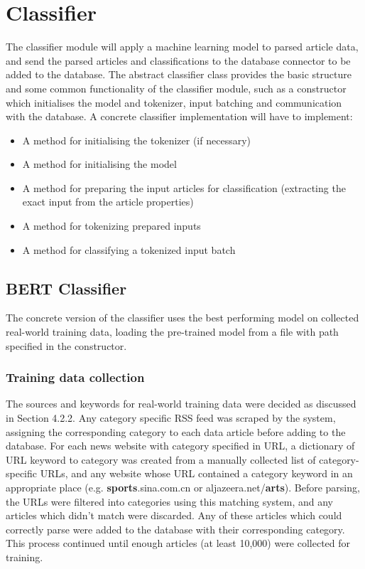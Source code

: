 \documentclass{l4proj}
\begin{document}
\section{Classifier}
The classifier module will apply a machine learning model to parsed article data, and send the parsed articles and classifications to the database connector to be added to the database. The abstract classifier class provides the basic structure and some common functionality of the classifier module, such as a constructor which initialises the model and tokenizer, input batching and communication with the database. A concrete classifier implementation will have to implement:
\begin{itemize}
    \item A method for initialising the tokenizer (if necessary)
    \item A method for initialising the model
    \item A method for preparing the input articles for classification (extracting the exact input from the article properties)
    \item A method for tokenizing prepared inputs
    \item A method for classifying a tokenized input batch
\end{itemize}

\subsection{BERT Classifier}
The concrete version of the classifier uses the best performing model on collected real-world training data, loading the pre-trained model from a file with path specified in the constructor. 
\subsubsection{Training data collection} \hfill \par
The sources and keywords for real-world training data were decided as discussed in Section 4.2.2. Any category specific RSS feed was scraped by the system, assigning the corresponding category to each data article before adding to the database. For each news website with category specified in URL, a dictionary of URL keyword to category was created from a manually collected list of category-specific URLs, and any website whose URL contained a category keyword in an appropriate place (e.g. \textbf{sports}.sina.com.cn or aljazeera.net/\textbf{arts}). Before parsing, the URLs were filtered into categories using this matching system, and any articles which didn't match were discarded. Any of these articles which could correctly parse were added to the database with their corresponding category. This process continued until enough articles (at least 10,000) were collected for training.
\end{document}
